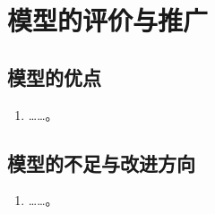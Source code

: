 \section{模型的评价与推广}


\subsection{模型的优点}
\begin{enumerate}
    \item ……。
\end{enumerate}

\subsection{模型的不足与改进方向}
\begin{enumerate}
    \item ……。
\end{enumerate}


